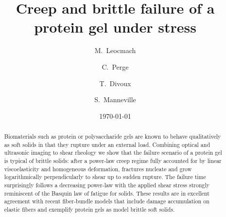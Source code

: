 \documentclass[twocolumn,superscriptaddress,showpacs,preprintnumbers,amsmath,amssymb,prl]{revtex4}
\begin{document}

 \title{Creep and brittle failure of a protein gel under stress}

\author{M.~Leocmach}
\author{C.~Perge}
\author{T.~Divoux}
\author{S.~Manneville}

\date{\today}

\begin{abstract}
Biomaterials such as protein or polysaccharide gels are known to behave qualitatively as soft solids in that they rupture under an external load. Combining optical and ultrasonic imaging to shear rheology we show that the failure scenario of a protein gel is typical of brittle solids: after a power-law creep regime fully accounted for by linear viscoelasticity and homogeneous deformation, fractures nucleate and grow logarithmically perpendicularly to shear up to sudden rupture. The failure time surprisingly follows a decreasing power-law with the applied shear stress strongly reminiscent of the Basquin law of fatigue for solids. These results are in excellent agreement with recent fiber-bundle models that include damage accumulation on elastic fibers and exemplify protein gels as model brittle soft solids.
\end{abstract}

\pacs{}
\maketitle
\end{document}
